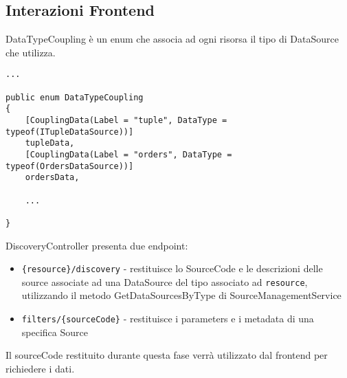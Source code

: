 \subsection{Interazioni Frontend}
\label{chap:frontend}
DataTypeCoupling è un enum che associa ad ogni risorsa il tipo di DataSource che utilizza.
\begin{lstlisting}[caption={DataTypeCoupling.cs}, style=sharpCode]
...

public enum DataTypeCoupling
{
    [CouplingData(Label = "tuple", DataType = typeof(ITupleDataSource))]
    tupleData,
    [CouplingData(Label = "orders", DataType = typeof(OrdersDataSource))]
    ordersData,

    ... 

}
\end{lstlisting}
DiscoveryController presenta due endpoint:
\begin{itemize}
\item \verb|{resource}/discovery| - restituisce lo SourceCode e le descrizioni delle source associate ad una DataSource del tipo associato ad \verb|resource|, utilizzando il metodo GetDataSourcesByType di SourceManagementService
\item \verb|filters/{sourceCode}| - restituisce i parameters e i metadata di una specifica Source
\end{itemize}
Il sourceCode restituito durante questa fase verrà utilizzato dal frontend per richiedere i dati.

